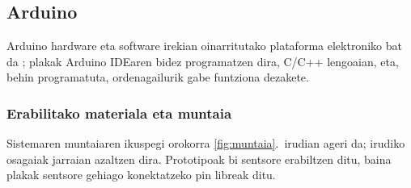 \documentclass[10pt]{article}
\begin{document}
\subsection{Arduino}
\label{sec:arduino}

Arduino hardware eta software irekian oinarritutako plataforma elektroniko bat da \cite{herrador2009guia}; plakak Arduino \ac{IDE}aren bidez programatzen dira, C/C++ lengoaian, eta, behin programatuta, ordenagailurik gabe funtziona dezakete.\\

\subsubsection{Erabilitako materiala eta muntaia}

Sistemaren muntaiaren ikuspegi orokorra \ref{fig:muntaia}.~irudian ageri da; irudiko osagaiak jarraian azaltzen dira. Prototipoak bi sentsore erabiltzen ditu, baina plakak sentsore gehiago konektatzeko pin libreak ditu.
\end{document}
